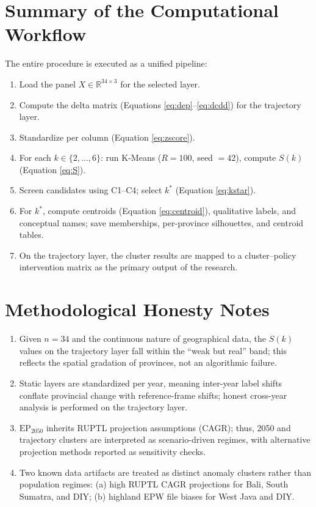 \documentclass[11pt,a4paper]{article}
\begin{document}
\section{Summary of the Computational Workflow}
The entire procedure is executed as a unified pipeline:
\begin{enumerate}[nosep]
\item Load the panel $X \in \mathbb{R}^{34 \times 3}$ for the selected layer.
\item Compute the delta matrix (Equations \ref{eq:dep}--\ref{eq:dcdd}) for the trajectory layer.
\item Standardize per column (Equation \ref{eq:zscore}).
\item For each $k \in \{2,\dots,6\}$: run K-Means ($R=100$, seed $=42$), compute $S(k)$ (Equation \ref{eq:S}).
\item Screen candidates using C1--C4; select $k^\ast$ (Equation \ref{eq:kstar}).
\item For $k^\ast$, compute centroids (Equation \ref{eq:centroid}), qualitative labels, and conceptual names; save memberships, per-province silhouettes, and centroid tables.
\item On the trajectory layer, the cluster results are mapped to a cluster--policy intervention matrix as the primary output of the research.
\end{enumerate}

\section*{Methodological Honesty Notes}
\begin{enumerate}[nosep]
\item Given $n=34$ and the continuous nature of geographical data, the $S(k)$ values on the trajectory layer fall within the ``weak but real'' band; this reflects the spatial gradation of provinces, not an algorithmic failure.
\item Static layers are standardized per year, meaning inter-year label shifts conflate provincial change with reference-frame shifts; honest cross-year analysis is performed on the trajectory layer.
\item $\mathrm{EP}_{2050}$ inherits RUPTL projection assumptions (CAGR); thus, 2050 and trajectory clusters are interpreted as scenario-driven regimes, with alternative projection methods reported as sensitivity checks.
\item Two known data artifacts are treated as distinct anomaly clusters rather than population regimes: (a) high RUPTL CAGR projections for Bali, South Sumatra, and DIY; (b) highland EPW file biases for West Java and DIY.
\end{enumerate}
\end{document}
